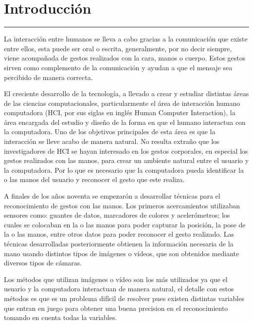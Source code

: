 \chapter{Introducci\'on}\label{capit:cap1}
\vspace{-2.0325ex}%
\noindent
\rule{\textwidth}{0.5pt}
\vspace{-5.5ex}%
\newcommand{\pushline}{\Indp}%

La interacción entre humanos se lleva a cabo gracias a la comunicación  que existe entre ellos, esta puede ser oral o escrita, generalmente, por no decir siempre, viene acompañada de gestos realizados con la cara, manos o cuerpo. 
Estos gestos sirven como complemento de la comunicación y ayudan a que el mensaje sea percibido de manera correcta.


El creciente desarrollo de la tecnología, a llevado  a crear y estudiar distintas áreas de las ciencias computacionales, particularmente el área de interacción humano computadora (HCI, por sus siglas en ingl\'es Human Computer Interaction), la área encargada del estudio y diseño de la forma en que el humano interactua con la computadora. 
Uno de los objetivos principales de esta área es que la interacción se lleve acabo de manera natural. 
No resulta extraño que los investigadores de HCI se hayan interesado en los gestos corporales, en especial los gestos realizados con las manos, para crear un ambiente natural entre el usuario y la computadora.  
Por lo que es necesario que la computadora pueda identificar la o las manos del usuario y reconocer el gesto que este realiza. 

A finales de los años noventa se empezar\'on a desarrollar t\'ecnicas para  el reconocimiento de gestos con las manos. Los primeros acercamientos utilizaban sensores como: guantes de datos, marcadores de colores y acelerómetros; los cuales se colocaban en la o las manos para poder capturar la posición, la pose de la o las manos, entre otros datos para poder reconocer el gesto realizado. 
Las técnicas desarrolladas posteriormente obtienen la información necesaria de la mano usando distintos tipos de imágenes o vídeos, que son obtenidos mediante diversos tipos de cámaras.

Los métodos que utilizan imágenes o vídeo son los más utilizados ya que el usuario y la computadora interactuan de manera natural, el detalle con estos métodos es que es un problema difícil de resolver pues existen distintas variables que entran en juego para obtener una buena precision en el reconocimiento tomando en cuenta todas la variables. 

